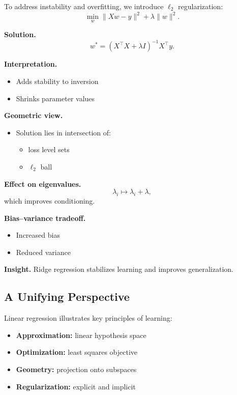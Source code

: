 To address instability and overfitting, we introduce $\ell_2$ regularization:
\[
\min_w \|Xw - y\|^2 + \lambda \|w\|^2.
\]

\medskip

\noindent
\textbf{Solution.}
\[
w^* = (X^\top X + \lambda I)^{-1} X^\top y.
\]

\medskip

\noindent
\textbf{Interpretation.}
\begin{itemize}
    \item Adds stability to inversion
    \item Shrinks parameter values
\end{itemize}

\medskip

\noindent
\textbf{Geometric view.}
\begin{itemize}
    \item Solution lies in intersection of:
    \begin{itemize}
        \item loss level sets
        \item $\ell_2$ ball
    \end{itemize}
\end{itemize}

\medskip

\noindent
\textbf{Effect on eigenvalues.}
\[
\lambda_i \mapsto \lambda_i + \lambda,
\]
which improves conditioning.

\medskip

\noindent
\textbf{Bias--variance tradeoff.}
\begin{itemize}
    \item Increased bias
    \item Reduced variance
\end{itemize}

\medskip

\noindent
\textbf{Insight.}  
Ridge regression stabilizes learning and improves generalization.

\subsection{A Unifying Perspective}

Linear regression illustrates key principles of learning:

\begin{itemize}
    \item \textbf{Approximation:} linear hypothesis space
    \item \textbf{Optimization:} least squares objective
    \item \textbf{Geometry:} projection onto subspaces
    \item \textbf{Regularization:} explicit and implicit
\end{itemize}

